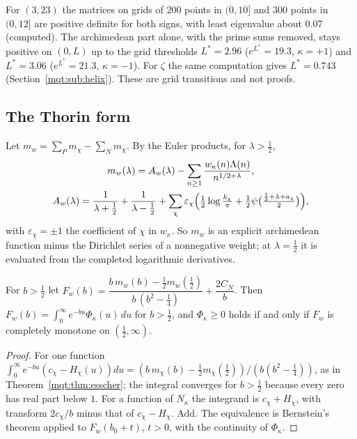 For $(3,23)$ the matrices on grids of $200$ points in $(0,10]$ and $300$ points in $(0,12]$ are positive definite for both signs, with least eigenvalue about $0.07$ (computed). The archimedean part alone, with the prime sums removed, stays positive on $(0,L)$ up to the grid thresholds $L^*=2.96$ ($e^{L^*}=19.3$, $\kappa=+1$) and $L^*=3.06$ ($e^{L^*}=21.3$, $\kappa=-1$). For $\zeta$ the same computation gives $L^*=0.743$ (Section~\ref{mqt:sub:helix}). These are grid transitions and not proofs.

\subsection{The Thorin form}\label{mqf:sub:thorin}

Let $m_w=\sum_Pm_\chi-\sum_Nm_\chi$. By the Euler products, for $\lambda>\frac12$,
\begin{equation}\label{mqf:eq:mw}
\begin{gathered}
m_w(\lambda)=A_w(\lambda)-\sum_{n\ge1}\frac{w_\kappa(n)\Lambda(n)}{n^{1/2+\lambda}},\\
A_w(\lambda)=\frac1{\lambda+\frac12}+\frac1{\lambda-\frac12}+\sum_\chi\varepsilon_\chi\Bigl(\tfrac12\log\tfrac{k_\chi}\pi+\tfrac12\psi\bigl(\tfrac{\frac12+\lambda+a_\chi}2\bigr)\Bigr),
\end{gathered}
\end{equation}
with $\varepsilon_\chi=\pm1$ the coefficient of $\chi$ in $w_\kappa$. So $m_w$ is an explicit archimedean function minus the Dirichlet series of a nonnegative weight; at $\lambda=\frac12$ it is evaluated from the completed logarithmic derivatives.

\begin{theorem}\label{mqf:thm:thorin}
For $b>\frac12$ let $F_w(b)=\dfrac{b\,m_w(b)-\frac12m_w(\frac12)}{b\,(b^2-\frac14)}+\dfrac{2C_N}b$. Then $F_w(b)=\int_0^\infty e^{-bu}\Phi_\kappa(u)\,du$ for $b>\frac12$, and $\Phi_\kappa\ge0$ holds if and only if $F_w$ is completely monotone on $(\frac12,\infty)$.
\end{theorem}

\begin{proof}
For one function $\int_0^\infty e^{-bu}(c_\chi-H_\chi(u))du=(b\,m_\chi(b)-\frac12m_\chi(\frac12))/(b(b^2-\frac14))$, as in Theorem~\ref{mqt:thm:esscher}; the integral converges for $b>\frac12$ because every zero has real part below $1$. For a function of $N_\kappa$ the integrand is $c_\chi+H_\chi$, with transform $2c_\chi/b$ minus that of $c_\chi-H_\chi$. Add. The equivalence is Bernstein's theorem applied to $F_w(b_0+t)$, $t>0$, with the continuity of $\Phi_\kappa$.
\end{proof}

